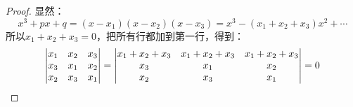 \begin{proof}
	显然：
	\begin{equation*}
		x^3+px+q=(x-x_1)(x-x_2)(x-x_3)=x^3-(x_1+x_2+x_3)x^2+\cdots
	\end{equation*}
	所以$x_1+x_2+x_3=0$，把所有行都加到第一行，得到：
	\begin{equation*}
		\begin{vmatrix}
			x_1 & x_2 & x_3 \\
			x_3 & x_1 & x_2 \\
			x_2 & x_3 & x_1
		\end{vmatrix}
		=
		\begin{vmatrix}
			x_1+x_2+x_3 & x_1+x_2+x_3 & x_1+x_2+x_3 \\
			x_3 & x_1 & x_2 \\
			x_2 & x_3 & x_1
		\end{vmatrix}
		=0\qedhere
	\end{equation*}
\end{proof}

